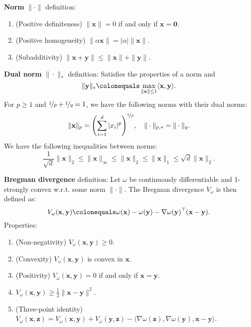 \documentclass{article}
\newcommand{\lft}{\mathopen{}\mathclose\bgroup\left}
\newcommand{\rgt}{\aftergroup\egroup\right}
\renewcommand{\vec}[1]{\mathbf{#1}}
\newenvironment{topic}[1]
{\textbf{\sffamily \colorbox{black}{\rlap{\textbf{\textcolor{white}{#1}}}\hspace{\linewidth}\hspace{-2\fboxsep}}} \\ \vspace{0.2cm}}
{}
\begin{document}
\begin{multicols*}{2}
\begin{topic}{Subgradient method}
    \end{topic}

    \begin{topic}{Mirror descent}
        \textbf{Norm} $\| \cdot \|$ definition:
        \begin{enumerate}
            \item (Positive definiteness) $\| \vec{x} \| = 0$ if and only if $\vec{x} = \vec{0}$.
            \item (Positive homogeneity) $\| \alpha \vec{x} \| = |\alpha| \| \vec{x} \|$.
            \item (Subadditivity) $\| \vec{x} + \vec{y} \| \leq \| \vec{x} \| + \| \vec{y} \|$.
        \end{enumerate}

        \textbf{Dual norm} $\| \cdot \|_*$ definition: Satisfies the properties of a norm and \[
            \| \vec{y} \|_* \colonequals \max_{\| \vec{x} \| \leq 1} \langle \vec{x}, \vec{y} \rangle.
        \]
        For $p \geq 1$ and $\nicefrac{1}{p} + \nicefrac{1}{q} = 1$, we have the following norms with their
        dual norms: \[
            \| \vec{x} \|_p = \lft( \sum_{i=1}^{d} |x_i|^p \rgt)^{\nicefrac{1}{p}}, \quad \| \cdot \|_{p,*} = \| \cdot \|_q.
        \]
        We have the following inequalities between norms: \[
            \frac{1}{\sqrt{d}} \| \vec{x} \|_2 \leq \| \vec{x} \|_\infty \leq \| \vec{x} \|_2 \leq \| \vec{x} \|_1 \leq \sqrt{d} \| \vec{x} \|_2.
        \]

        \textbf{Bregman divergence} definition: Let $\omega$ be continuously differentiable and 1-strongly convex
        w.r.t. some norm $\| \cdot \|$. The Bregman divergence $V_{\omega}$ is then defined as: \[
            V_{\omega}(\vec{x}, \vec{y}) \colonequals \omega(\vec{x}) - \omega(\vec{y}) - \nabla \omega(\vec{y})^\top (\vec{x} - \vec{y}).
        \]
        Properties:
        \begin{enumerate}
            \item (Non-negativity) $V_{\omega}(\vec{x}, \vec{y}) \geq 0$.
            \item (Convexity) $V_{\omega}(\vec{x}, \vec{y})$ is convex in $\vec{x}$.
            \item (Positivity) $V_{\omega}(\vec{x}, \vec{y}) = 0$ if and only if $\vec{x} = \vec{y}$.
            \item $V_{\omega}(\vec{x}, \vec{y}) \geq \frac{1}{2} \| \vec{x} - \vec{y} \|^2$.
            \item (Three-point identity) $V_{\omega}(\vec{x}, \vec{z}) = V_{\omega}(\vec{x}, \vec{y}) + V_{\omega}(\vec{y}, \vec{z}) - \langle \nabla \omega(\vec{z}), \nabla \omega(\vec{y}), \vec{x} - \vec{y} \rangle$.
        \end{enumerate}


\end{topic}
\end{multicols*}
\end{document}
